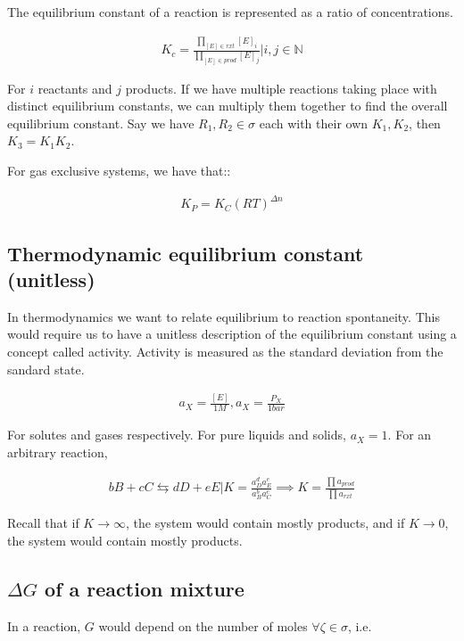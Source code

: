 \documentclass[12pt]{book}
\begin{document}
The equilibrium constant of a reaction is represented as a ratio of concentrations.

\begin{align*}
    K_c=\frac{\prod_{\left[E\right]\in rxt} \left[E\right]_i}{\prod_{\left[E\right]\in prod} \left[E\right]_j}|i,j\in \mathbb{N}
\end{align*}

For $i$ reactants and $j$ products. If we have multiple reactions taking place with distinct equilibrium constants, we can multiply them together to find the overall equilibrium constant. Say we have $R_1,R_2\in \sigma$ each with their own $K_1,K_2$, then $K_3=K_1K_2$.

For gas exclusive systems, we have that::

\begin{align*}
    K_P=K_C (RT)^{\Delta n}
\end{align*}

\subsection*{Thermodynamic equilibrium constant (unitless)}

In thermodynamics we want to relate equilibrium to reaction spontaneity. This would require us to have a unitless description of the equilibrium constant using a concept called activity. Activity is measured as the standard deviation from the sandard state.

\begin{align*}
    a_X=\frac{\left[E\right]}{1M}, a_X=\frac{P_X}{1bar}
\end{align*}

For solutes and gases respectively. For pure liquids and solids, $a_X=1$. For an arbitrary reaction,

\begin{align*}
    bB+cC\leftrightarrows dD+eE|K=\frac{a_D^d a_E^e}{a_B^b a_C^c}\implies K=\frac{\prod a_{prod}}{\prod a_{rxt}}
\end{align*}

Recall that if $K\rightarrow \infty$, the system would contain mostly products, and if $K\rightarrow 0$, the system would contain mostly products.

\subsection*{$\Delta G$ of a reaction mixture}

In a reaction, $G$ would depend on the number of moles $\forall \zeta\in \sigma$, i.e.
\end{document}
